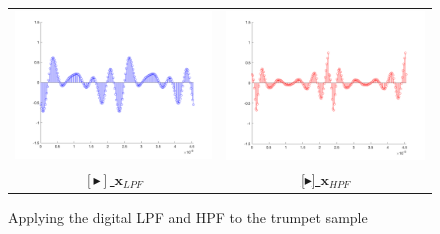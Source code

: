 \begin{figure}[h]
\begin{tabular}{cc}
        \includegraphics[scale=.18]{trumpetA4_LPF.png} & \includegraphics[scale=.18]{trumpetA4_HPF.png}\\
        \href{https://drive.google.com/file/d/11VIUtV8aZl_dNzAf_yXvUNOXUuvRN_Sn/view?usp=sharing}{\color{blue} $[\blacktriangleright]$ $\mathbf{x}_{LPF}$} & \href{https://drive.google.com/file/d/1ZO75jIXYz4RDh-7DFfPc0oz6mco8o-7i/view?usp=sharing}{\color{blue} [$\blacktriangleright$] $\mathbf{x}_{HPF}$}\\
    \end{tabular}
    \caption{Applying the digital LPF and HPF to the trumpet sample}
    \label{fig:trumpetA4_filtered}
\end{figure}

